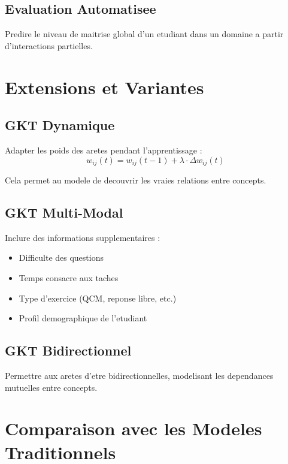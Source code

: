 \documentclass[11pt, a4paper]{article}
\begin{document}
\subsection{Evaluation Automatisee}

Predire le niveau de maitrise global d'un etudiant dans un domaine a partir d'interactions partielles.

\section{Extensions et Variantes}

\subsection{GKT Dynamique}

Adapter les poids des aretes pendant l'apprentissage :
\begin{equation}
    w_{ij}(t) = w_{ij}(t-1) + \lambda \cdot \Delta w_{ij}(t)
\end{equation}

Cela permet au modele de decouvrir les vraies relations entre concepts.

\subsection{GKT Multi-Modal}

Inclure des informations supplementaires :
\begin{itemize}
    \item Difficulte des questions
    \item Temps consacre aux taches
    \item Type d'exercice (QCM, reponse libre, etc.)
    \item Profil demographique de l'etudiant
\end{itemize}

\subsection{GKT Bidirectionnel}

Permettre aux aretes d'etre bidirectionnelles, modelisant les dependances mutuelles entre concepts.

\section{Comparaison avec les Modeles Traditionnels}
\end{document}

